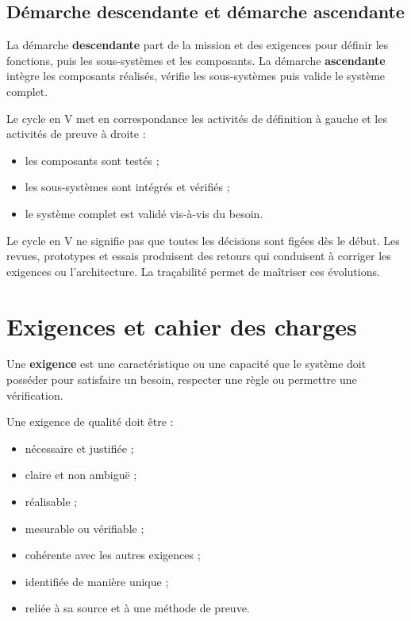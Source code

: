 \subsection{Démarche descendante et démarche ascendante}

La démarche \textbf{descendante} part de la mission et des exigences pour définir les fonctions, puis les sous-systèmes et les composants. La démarche \textbf{ascendante} intègre les composants réalisés, vérifie les sous-systèmes puis valide le système complet.

\ISCycleEnV

Le cycle en V met en correspondance les activités de définition à gauche et les activités de preuve à droite :
\begin{itemize}
  \item les composants sont testés ;
  \item les sous-systèmes sont intégrés et vérifiés ;
  \item le système complet est validé vis-à-vis du besoin.
\end{itemize}

\begin{ISattention}
Le cycle en V ne signifie pas que toutes les décisions sont figées dès le début. Les revues, prototypes et essais produisent des retours qui conduisent à corriger les exigences ou l'architecture. La traçabilité permet de maîtriser ces évolutions.
\end{ISattention}

\section{Exigences et cahier des charges}\label{sec:is-exigences}

\begin{ISdefinition}
Une \textbf{exigence} est une caractéristique ou une capacité que le système doit posséder pour satisfaire un besoin, respecter une règle ou permettre une vérification.
\end{ISdefinition}

Une exigence de qualité doit être :
\begin{itemize}
  \item nécessaire et justifiée ;
  \item claire et non ambiguë ;
  \item réalisable ;
  \item mesurable ou vérifiable ;
  \item cohérente avec les autres exigences ;
  \item identifiée de manière unique ;
  \item reliée à sa source et à une méthode de preuve.
\end{itemize}

